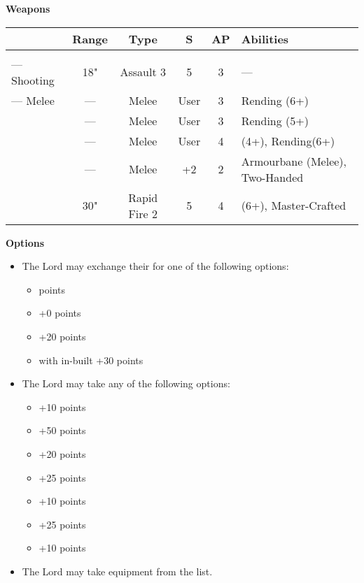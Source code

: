\begin{minipage}[t]{0.72\textwidth}
	\vspace*{2em}
	\textbf{Weapons}
	
	\begin{tabular}{m{95 pt} *{4}{c} >{\raggedright\arraybackslash}p{130pt}}
		& Range & Type & S & AP & Abilities \\
		\hline
		\quickref{Staff of Light} & & &  &  &  \\
		— Shooting & 18" & Assault 3 & 5 & 3 & — \\
		— Melee & — & Melee & User & 3 & Rending (6+) \\
		\quickref{Hyperphase Sword} & — & Melee & User & 3 & Rending (5+) \\
		\quickref{Voidblade} & — & Melee & User & 4 & \quickref{Entropic Strike} (4+), Rending(6+) \\
		\quickref{Warscythe} & — & Melee & +2 & 2 & Armourbane (Melee), Two-Handed \\
		\quickref{Relic Gauss Blaster} & 30" & Rapid Fire 2 & 5 & 4 & \quickref{Gauss} (6+), Master-Crafted \\
	\end{tabular}
	
	\vspace*{2em}
	\textbf{Options}
	\begin{itemize}
		\item The Lord may exchange their  for one of the following options:
		\begin{itemize}			
			\item {}  points
			\item {} \dotfill +0 points
			\item {} \dotfill +20 points
			\item {} with in-built  \dotfill +30 points
		\end{itemize}
		\item The Lord may take any of the following options:
		\begin{itemize}
			\item {} \dotfill +10 points
			\item {} \dotfill +50 points
			\item {} \dotfill +20 points
			\item {} \dotfill +25 points
			\item {} \dotfill +10 points
			\item {} \dotfill +25 points
			\item {} \dotfill +10 points
		\end{itemize}
		\item The Lord may take equipment from the  list.
	\end{itemize}
\end{minipage}



